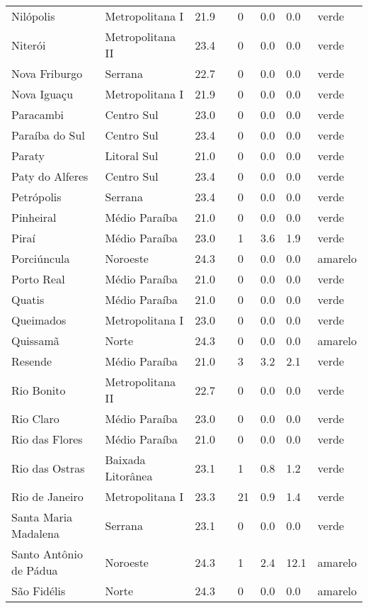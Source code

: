 \begin{longtable}{l|lllllll}
  Nilópolis & Metropolitana I & 21.9 &  & 0 & 0.0 & 0.0 & verde \\ 
  Niterói & Metropolitana II & 23.4 &  & 0 & 0.0 & 0.0 & verde \\ 
  Nova Friburgo & Serrana & 22.7 &  & 0 & 0.0 & 0.0 & verde \\ 
  Nova Iguaçu & Metropolitana I & 21.9 &  & 0 & 0.0 & 0.0 & verde \\ 
  Paracambi & Centro Sul & 23.0 &  & 0 & 0.0 & 0.0 & verde \\ 
  Paraíba do Sul & Centro Sul & 23.4 &  & 0 & 0.0 & 0.0 & verde \\ 
  Paraty & Litoral Sul & 21.0 &  & 0 & 0.0 & 0.0 & verde \\ 
  Paty do Alferes & Centro Sul & 23.4 &  & 0 & 0.0 & 0.0 & verde \\ 
  Petrópolis & Serrana & 23.4 &  & 0 & 0.0 & 0.0 & verde \\ 
  Pinheiral & Médio Paraíba & 21.0 &  & 0 & 0.0 & 0.0 & verde \\ 
  Piraí & Médio Paraíba & 23.0 &  & 1 & 3.6 & 1.9 & verde \\ 
  Porciúncula & Noroeste & 24.3 &  & 0 & 0.0 & 0.0 & amarelo \\ 
  Porto Real & Médio Paraíba & 21.0 &  & 0 & 0.0 & 0.0 & verde \\ 
  Quatis & Médio Paraíba & 21.0 &  & 0 & 0.0 & 0.0 & verde \\ 
  Queimados & Metropolitana I & 23.0 &  & 0 & 0.0 & 0.0 & verde \\ 
  Quissamã & Norte & 24.3 &  & 0 & 0.0 & 0.0 & amarelo \\ 
  Resende & Médio Paraíba & 21.0 &  & 3 & 3.2 & 2.1 & verde \\ 
  Rio Bonito & Metropolitana II & 22.7 &  & 0 & 0.0 & 0.0 & verde \\ 
  Rio Claro & Médio Paraíba & 23.0 &  & 0 & 0.0 & 0.0 & verde \\ 
  Rio das Flores & Médio Paraíba & 21.0 &  & 0 & 0.0 & 0.0 & verde \\ 
  Rio das Ostras & Baixada Litorânea & 23.1 &  & 1 & 0.8 & 1.2 & verde \\ 
  Rio de Janeiro & Metropolitana I & 23.3 &  & 21 & 0.9 & 1.4 & verde \\ 
  Santa Maria Madalena & Serrana & 23.1 &  & 0 & 0.0 & 0.0 & verde \\ 
  Santo Antônio de Pádua & Noroeste & 24.3 &  & 1 & 2.4 & 12.1 & amarelo \\ 
  São Fidélis & Norte & 24.3 &  & 0 & 0.0 & 0.0 & amarelo \\ 

\end{longtable}
